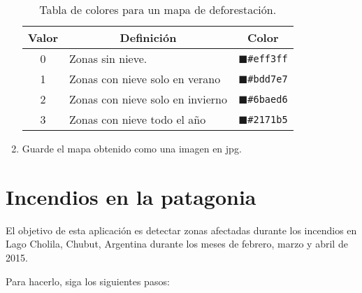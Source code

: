 \begin{enumerate}
\begin{table}[]
\centering
\begin{tabular}{@{}cll@{}}
\toprule
Valor  & \multicolumn{1}{c}{Definición}   & \multicolumn{1}{c}{Color}                       \\ \midrule
0      & Zonas sin nieve.                 & \textcolor{N1}{$\blacksquare$}\texttt{\#eff3ff} \\
1      & Zonas con nieve solo en verano   & \textcolor{N2}{$\blacksquare$}\texttt{\#bdd7e7} \\
2      & Zonas con nieve solo en invierno & \textcolor{N3}{$\blacksquare$}\texttt{\#6baed6} \\
3      & Zonas con nieve todo el año      & \textcolor{N4}{$\blacksquare$}\texttt{\#2171b5} \\ \bottomrule
\end{tabular}
\caption{Tabla de colores para un mapa de deforestación.}
\label{tab:nieve}
\end{table}

\item Guarde el mapa obtenido como una imagen en jpg.
\end{enumerate}

\section{Incendios en la patagonia}

El objetivo de esta aplicación es detectar zonas afectadas durante los incendios en Lago Cholila, Chubut, Argentina durante los meses de febrero, marzo y abril de 2015.

Para hacerlo, siga los siguientes pasos:

